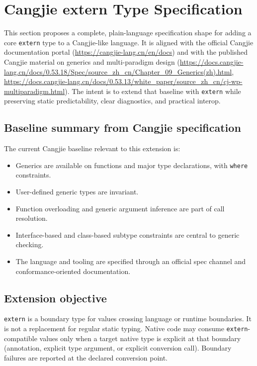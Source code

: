 \documentclass[11pt,a4paper]{article}
\begin{document}
\section{Cangjie \textsf{extern} Type Specification}
\label{sec:cangjie-extern-draft}

This section proposes a complete, plain-language specification shape for adding a core \texttt{extern} type to a Cangjie-like language.
It is aligned with the official Cangjie documentation portal (\url{https://cangjie-lang.cn/en/docs}) and with the published Cangjie material on generics and multi-paradigm design (\url{https://docs.cangjie-lang.cn/docs/0.53.18/Spec/source_zh_cn/Chapter_09_Generics(zh).html}, \url{https://docs.cangjie-lang.cn/docs/0.53.13/white_paper/source_zh_cn/cj-wp-multiparadigm.html}).
The intent is to extend that baseline with \texttt{extern} while preserving static predictability, clear diagnostics, and practical interop.

\subsection{Baseline summary from Cangjie specification}

The current Cangjie baseline relevant to this extension is:
\begin{itemize}
  \item Generics are available on functions and major type declarations, with \texttt{where} constraints.
  \item User-defined generic types are invariant.
  \item Function overloading and generic argument inference are part of call resolution.
  \item Interface-based and class-based subtype constraints are central to generic checking.
  \item The language and tooling are specified through an official spec channel and conformance-oriented documentation.
\end{itemize}

\subsection{Extension objective}

\texttt{extern} is a boundary type for values crossing language or runtime boundaries.
It is not a replacement for regular static typing.
Native code may consume \texttt{extern}-compatible values only when a target native type is explicit at that boundary (annotation, explicit type argument, or explicit conversion call).
Boundary failures are reported at the declared conversion point.
\end{document}
